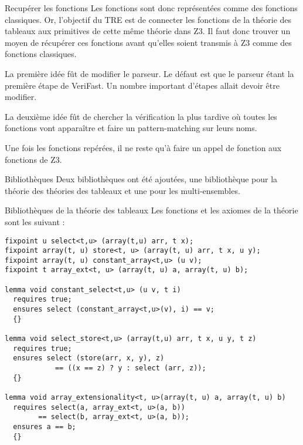 \documentclass[9pt]{beamer}
\newcommand{\verifast}{VeriFast}
\begin{document}
\begin{frame}{Recup\'erer les fonctions}
Les fonctions sont donc repr\'esent\'ees comme des fonctions classiques. Or, l'objectif du TRE est de connecter les fonctions de la th\'eorie des tableaux aux primitives de cette m\^eme th\'eorie dans Z3. Il faut donc trouver un moyen de r\'ecup\'erer ces fonctions avant qu'elles soient transmis \`a Z3 comme des fonctions classiques.

La premi\`ere id\'ee f\^ut de modifier le parseur. Le d\'efaut est que le parseur \'etant la premi\`ere \'etape de \verifast. Un nombre important d'\'etapes allait devoir \^etre modifier.

La deuxi\`eme id\'ee f\^ut de chercher la v\'erification la plus tardive o\`u toutes les fonctions vont appara\^itre et faire un pattern-matching sur leurs noms.

Une fois les fonctions rep\'er\'ees, il ne reste qu'\`a faire un appel de fonction aux fonctions de Z3.

\end{frame}

\begin{frame}{Biblioth\`eques}
Deux biblioth\`eques ont \'et\'e ajout\'ees, une biblioth\`eque pour la th\'eorie des th\'eories des tableaux et une pour les multi-ensembles.
\end{frame}

\begin{frame}[fragile]{Biblioth\`eques de la th\'eorie des tableaux}
Les fonctions et les axiomes de la th\'eorie sont les suivant :
			\begin{lstlisting}[basicstyle=\footnotesize]
fixpoint u select<t,u> (array(t,u) arr, t x);
fixpoint array(t, u) store<t, u> (array(t, u) arr, t x, u y);
fixpoint array(t, u) constant_array<t,u> (u v);
fixpoint t array_ext<t, u> (array(t, u) a, array(t, u) b);

lemma void constant_select<t,u> (u v, t i)
  requires true;
  ensures select (constant_array<t,u>(v), i) == v;
  {}
  
lemma void select_store<t,u> (array(t,u) arr, t x, u y, t z)
  requires true;
  ensures select (store(arr, x, y), z) 
    		== ((x == z) ? y : select (arr, z));
  {}
    		
lemma void array_extensionality<t, u>(array(t, u) a, array(t, u) b)
  requires select(a, array_ext<t, u>(a, b)) 
		== select(b, array_ext<t, u>(a, b));
  ensures a == b;
  {}
			\end{lstlisting}
\end{frame}
\end{document}
